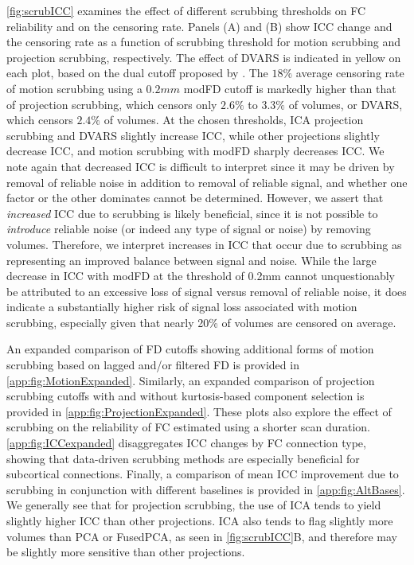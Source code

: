 \documentclass{article}
\begin{document}
\autoref{fig:scrubICC} examines the effect of different scrubbing thresholds on FC reliability and on the censoring rate. Panels (A) and (B) show ICC change and the censoring rate as a function of scrubbing threshold for motion scrubbing and projection scrubbing, respectively. The effect of DVARS is indicated in yellow on each plot, based on the dual cutoff proposed by \citet{afyouniInsightInferenceDVARS2018}. The $18\%$ average censoring rate of motion scrubbing using a $0.2mm$ modFD cutoff is markedly higher than that of projection scrubbing, which censors only $2.6\%$ to $3.3\%$ of volumes, or DVARS, which censors $2.4\%$ of volumes. At the chosen thresholds, ICA projection scrubbing and DVARS slightly increase ICC, while other projections slightly decrease ICC, and motion scrubbing with modFD sharply decreases ICC. We note again that decreased ICC is difficult to interpret since it may be driven by removal of reliable noise in addition to removal of reliable signal, and whether one factor or the other dominates cannot be determined.  However, we assert that \textit{increased} ICC due to scrubbing is likely beneficial, since it is not possible to \textit{introduce} reliable noise (or indeed any type of signal or noise) by removing volumes. %
Therefore, we interpret increases in ICC that occur due to scrubbing as representing an improved balance between signal and noise. While the large decrease in ICC with modFD at the threshold of 0.2mm cannot unquestionably be attributed to an excessive loss of signal versus removal of reliable noise, it does indicate a substantially higher risk of signal loss associated with motion scrubbing, especially given that nearly 20\% of volumes are censored on average.

An expanded comparison of FD cutoffs showing additional forms of motion scrubbing based on lagged and/or filtered FD is provided in \autoref{app:fig:MotionExpanded}. Similarly, an expanded comparison of projection scrubbing cutoffs with and without kurtosis-based component selection is provided in \autoref{app:fig:ProjectionExpanded}. These plots also explore the effect of scrubbing on the reliability of FC estimated using a shorter scan duration. \autoref{app:fig:ICCexpanded} disaggregates ICC changes by FC connection type, showing that data-driven scrubbing methods are especially beneficial for subcortical connections. Finally, a comparison of mean ICC improvement due to scrubbing in conjunction with different baselines is provided in \autoref{app:fig:AltBases}. We generally see that for projection scrubbing, the use of ICA tends to yield slightly higher ICC than other projections. ICA also tends to flag slightly more volumes than PCA or FusedPCA, as seen in \autoref{fig:scrubICC}B, and therefore may be slightly more sensitive than other projections. 
\end{document}
